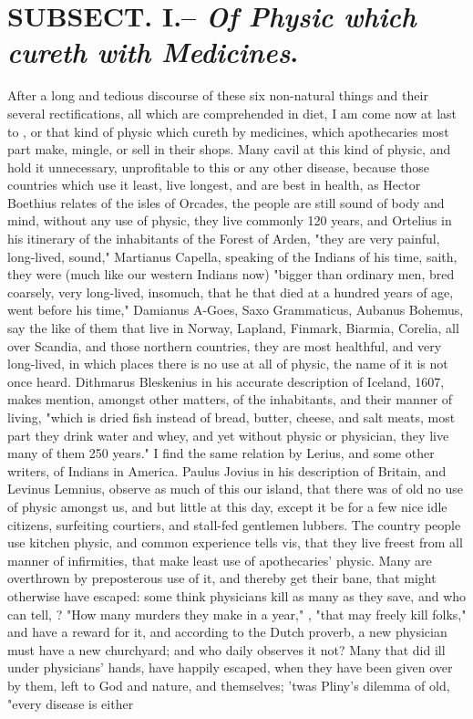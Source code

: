 {\section{ SUBSECT. I.-- \emph{Of Physic which cureth with Medicines}.}


After a long and tedious discourse of these six non-natural things and their several rectifications, all which are comprehended in diet, I am come now at last to , or that kind of physic which cureth by medicines, which apothecaries most part make, mingle, or sell in their shops. Many cavil at this kind of physic, and hold it unnecessary, unprofitable to this or any other disease, because those countries which use it least, live longest, and are best in health, as Hector Boethius relates of the isles of Orcades, the people are still sound of body and mind, without any use of physic, they live commonly 120 years, and Ortelius in his itinerary of the inhabitants of the Forest of Arden, "they are very painful, long-lived, sound," \etc{} Martianus Capella, speaking of the Indians of his time, saith, they were (much like our western Indians now) "bigger than ordinary men, bred coarsely, very long-lived, insomuch, that he that died at a hundred years of age, went before his time," \etc{} Damianus A-Goes, Saxo Grammaticus, Aubanus Bohemus, say the like of them that live in Norway, Lapland, Finmark, Biarmia, Corelia, all over Scandia, and those northern countries, they are most healthful, and very long-lived, in which places there is no use at all of physic, the name of it is not once heard. Dithmarus Bleskenius in his accurate description of Iceland, 1607, makes mention, amongst other matters, of the inhabitants, and their manner of living, "which is dried fish instead of bread, butter, cheese, and salt meats, most part they drink water and whey, and yet without physic or physician, they live many of them 250 years." I find the same relation by Lerius, and some other writers, of Indians in America. Paulus Jovius in his description of Britain, and Levinus Lemnius, observe as much of this our island, that there was of old no use of physic amongst us, and but little at this day, except it be for a few nice idle citizens, surfeiting courtiers, and stall-fed gentlemen lubbers. The country people use kitchen physic, and common experience tells vis, that they live freest from all manner of infirmities, that make least use of apothecaries' physic. Many are overthrown by preposterous use of it, and thereby get their bane, that might otherwise have escaped: some think physicians kill as many as they save, and who can tell, ? "How many murders they make in a year," , "that may freely kill folks," and have a reward for it, and according to the Dutch proverb, a new physician must have a new churchyard; and who daily observes it not? Many that did ill under physicians' hands, have happily escaped, when they have been given over by them, left to God and nature, and themselves; 'twas Pliny's dilemma of old, "every disease is either }
